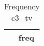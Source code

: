 \begin{table}[htbp]\centering
\def\sym#1{\ifmmode^{#1}\else\(^{#1}\)\fi}
\caption{Frequency c3\_tv \label{tab:"label"}}
\begin{tabular*}{0.9\hsize}{@{\hskip\tabcolsep\extracolsep\fill}l*{1}{c}}
\toprule
                                &     freq\\
\midrule
\bottomrule
\end{tabular*}
\end{table}
